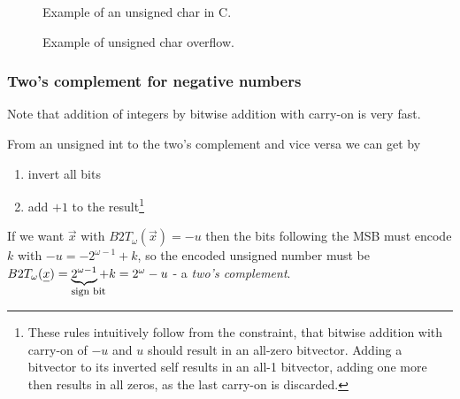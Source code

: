 
\begin{figure}[!htb]
 \centering
 \hfill
 \caption{Example of an unsigned char in C.}
 \label{fig:unchar}
\end{figure}

\begin{figure}[!htb]
    \centering
    \hfill
    \caption{Example of unsigned char overflow.}
    \label{fig:uncharadd}
\end{figure}

\subsubsection{Two's complement for negative numbers}
Note that addition of integers by bitwise addition with carry-on is very fast.


From an unsigned int to the two's complement and vice versa we can get by
\begin{enumerate}
    \item invert all bits
    \item add $+1$ to the result\footnote{These rules intuitively follow from the constraint, that bitwise addition with carry-on of $-u$ and $u$ should result in an all-zero bitvector. Adding a bitvector to its inverted self results in an all-1 bitvector, adding one more then results in all zeros, as the last carry-on is discarded.}
\end{enumerate}
If we want $\vec{x}$ with $B2T_\omega(\vec{x}) = -u$ then the bits following the MSB must encode $k$ with $-u = -2^{\omega-1} + k$,
so the encoded unsigned number must be $B2T_\omega(\vec{x}) = \explain{2^{\omega-1}}{\text{sign bit}} + k = 2^{\omega} - u$ - a \textit{two's complement}.

